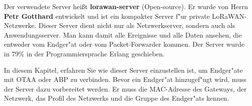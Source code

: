 Der verwendete Server hei\ss{}t \textbf{lorawan-server} (Open-source). Er
wurde von Herrn \textbf{Petr Gotthard} \cite{server} entwickelt und ist
ein kompakter Server f"ur private LoRaWAN-Netzwerke. Dieser Server dient
nicht nur als Netzwerkserver, sondern auch als Anwendungsserver. Man kann
damit alle Ereignisse und alle Daten ansehen, die entweder vom Endger"at oder
vom Packet-Forwarder kommen. Der Server wurde in 79\% in der
Programmiersprache Erlang \cite{erlang} geschieben.   

In diesem Kapitel, erfahren Sie wie dieser Server einzustellen ist, um
Endger"ate mit OTAA oder ABP zu verbinden. Bevor ein Endger"at
hinzugef"ugt wird, muss der Server dazu vorbereitet werden. Er muss die
MAC-Adresse des Gateways, der Netzwerk, das Profil des Netzwerks und die
Gruppe des Endger"ats kennen. 


